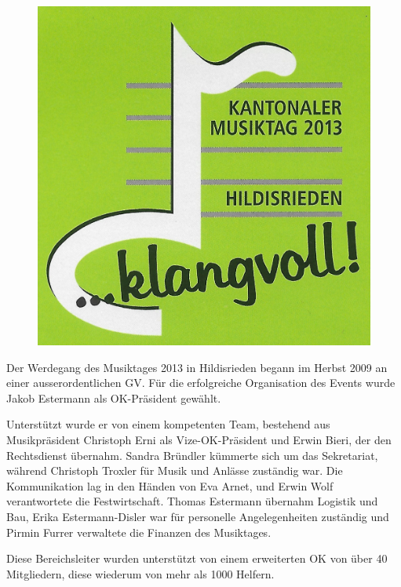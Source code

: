 \begin{history}

    \begin{figure}
        \includegraphics[width=\linewidth]{./chap/2001-2024/2013/Musiktag-Logo.jpg}
    \end{figure}

    Der Werdegang des Musiktages 2013 in Hildisrieden begann im Herbst 2009 an
    einer ausserordentlichen GV. Für die erfolgreiche Organisation des Events
    wurde Jakob Estermann als OK-Präsident gewählt.

    Unterstützt wurde er von einem kompetenten Team, bestehend aus
    Musikpräsident Christoph Erni als Vize-OK-Präsident und Erwin Bieri, der den
    Rechtsdienst übernahm. Sandra Bründler kümmerte sich um das Sekretariat,
    während Christoph Troxler für Musik und Anlässe zuständig war. Die
    Kommunikation lag in den Händen von Eva Arnet, und Erwin Wolf verantwortete
    die Festwirtschaft. Thomas Estermann übernahm Logistik und Bau, Erika
    Estermann-Disler war für personelle Angelegenheiten zuständig und Pirmin
    Furrer verwaltete die Finanzen des Musiktages.

    Diese Bereichsleiter wurden unterstützt von einem erweiterten OK von über 40
    Mitgliedern, diese wiederum von mehr als 1000 Helfern.


\end{history}
